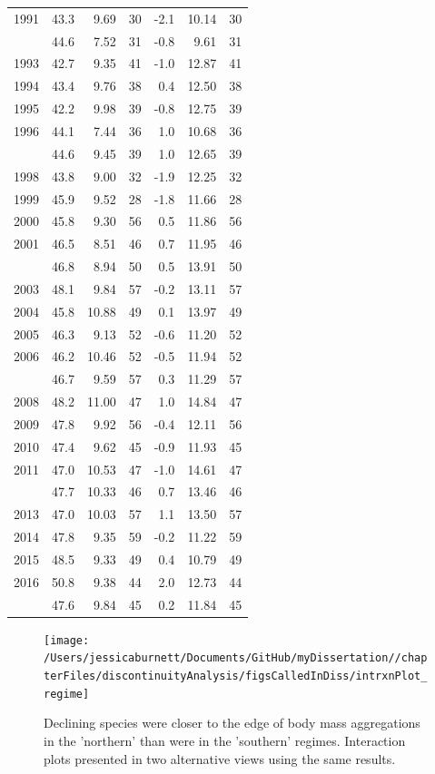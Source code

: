 \documentclass[12pt,twoside,openany]{reedthesis}
\begin{document}
\begin{longtable}{rrrrrrr}
1991 & 43.3 & 9.69 & 30 & -2.1 & 10.14 & 30\\
\addlinespace
1992 & 44.6 & 7.52 & 31 & -0.8 & 9.61 & 31\\
1993 & 42.7 & 9.35 & 41 & -1.0 & 12.87 & 41\\
1994 & 43.4 & 9.76 & 38 & 0.4 & 12.50 & 38\\
1995 & 42.2 & 9.98 & 39 & -0.8 & 12.75 & 39\\
1996 & 44.1 & 7.44 & 36 & 1.0 & 10.68 & 36\\
\addlinespace
1997 & 44.6 & 9.45 & 39 & 1.0 & 12.65 & 39\\
1998 & 43.8 & 9.00 & 32 & -1.9 & 12.25 & 32\\
1999 & 45.9 & 9.52 & 28 & -1.8 & 11.66 & 28\\
2000 & 45.8 & 9.30 & 56 & 0.5 & 11.86 & 56\\
2001 & 46.5 & 8.51 & 46 & 0.7 & 11.95 & 46\\
\addlinespace
2002 & 46.8 & 8.94 & 50 & 0.5 & 13.91 & 50\\
2003 & 48.1 & 9.84 & 57 & -0.2 & 13.11 & 57\\
2004 & 45.8 & 10.88 & 49 & 0.1 & 13.97 & 49\\
2005 & 46.3 & 9.13 & 52 & -0.6 & 11.20 & 52\\
2006 & 46.2 & 10.46 & 52 & -0.5 & 11.94 & 52\\
\addlinespace
2007 & 46.7 & 9.59 & 57 & 0.3 & 11.29 & 57\\
2008 & 48.2 & 11.00 & 47 & 1.0 & 14.84 & 47\\
2009 & 47.8 & 9.92 & 56 & -0.4 & 12.11 & 56\\
2010 & 47.4 & 9.62 & 45 & -0.9 & 11.93 & 45\\
2011 & 47.0 & 10.53 & 47 & -1.0 & 14.61 & 47\\
\addlinespace
2012 & 47.7 & 10.33 & 46 & 0.7 & 13.46 & 46\\
2013 & 47.0 & 10.03 & 57 & 1.1 & 13.50 & 57\\
2014 & 47.8 & 9.35 & 59 & -0.2 & 11.22 & 59\\
2015 & 48.5 & 9.33 & 49 & 0.4 & 10.79 & 49\\
2016 & 50.8 & 9.38 & 44 & 2.0 & 12.73 & 44\\
\addlinespace
2017 & 47.6 & 9.84 & 45 & 0.2 & 11.84 & 45\\
\bottomrule
\end{longtable}
\begin{figure}
\texttt{[image: /Users/jessicaburnett/Documents/GitHub/myDissertation//chapterFiles/discontinuityAnalysis/figsCalledInDiss/intrxnPlot\_regime]} \caption{Declining species were closer to the edge of body mass aggregations in the 'northern' than were in the 'southern' regimes. Interaction plots presented in two alternative views using the same results.}\label{fig:intrxnPlot-regime}
\end{figure}
\end{document}
